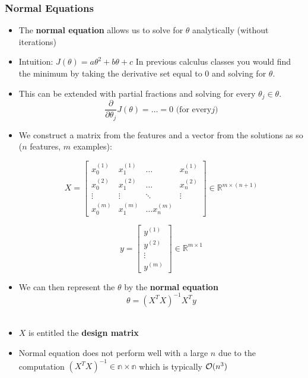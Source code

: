 \subsubsection{Normal Equations}
\begin{itemize}[--]
	\item The \textbf{normal equation} allows us to solve for $\theta$ analytically (without iterations)
	\item Intuition: $J(\theta) = a\theta^2+b\theta+c$
	In previous calculus classes you would find the minimum by taking the derivative set equal to 0 and solving for $\theta$. 
	\item This can be extended with partial fractions and solving for every $\theta_j\in\theta$. $$\frac{\partial}{\partial\theta_j}J(\theta)=\ldots=0 \text{    (for every}j\text{)}$$
	\item We construct a matrix from the features and a vector from the solutions as so ($n$ features, $m$ examples):

	\[X=\begin{bmatrix}
		x_0^{(1)} & x_1^{(1)} & \dots & x_n^{(1)} \\
		x_0^{(2)} & x_1^{(2)} & \dots & x_n^{(2)} \\
		\vdots & \vdots & \ddots & \vdots \\
		x_0^{(m)} & x_1^{(m)} & \dots x_n^{(m)} 
	\end{bmatrix} \in \mathbb{R}^{m\times (n+1)}
	 \]

	 \[
	y=\begin{bmatrix}
		y^{(1)} \\
		y^{(2)} \\
		\vdots \\
		y^{(m)}
	\end{bmatrix}\in \mathbb{R}^{m\times 1}
	 \]

	 \item We can then represent the $\theta$ by the \textbf{normal equation} $$\theta = (X^{T}X)^{-1}X^{T}y$$\
	 \item $X$ is entitled the \textbf{design matrix}
	 \item Normal equation does not perform well with a large $n$ due to the computation $(X^{T}X)^{-1}\in\mathbb{n\times n}$ which is typically $\mathcal{O}(n^3)$
\end{itemize}